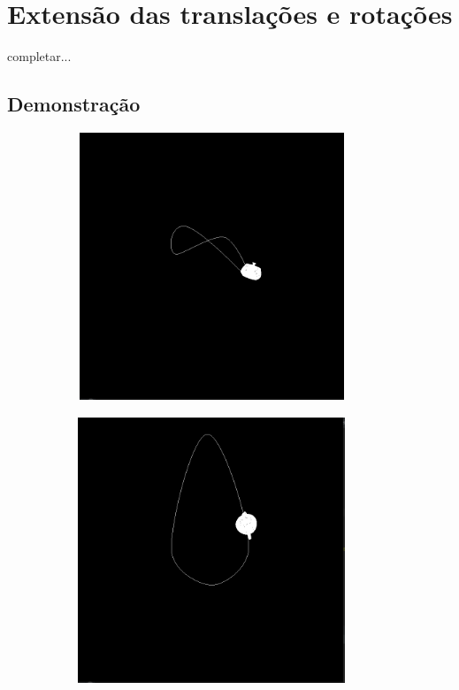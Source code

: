 \documentclass[11pt,a4paper]{report}
\begin{document}
\newpage
\section{Extensão das translações e rotações}
completar...


\subsection{Demonstração}

\vspace{1cm}
\begin{figure}[H]
\centering
\begin{subfigure}{0.5\textwidth}
  \centering
  \includegraphics[width = 8cm,height = 8cm]{catmul_teapot1.png}
  \caption{\texttt{}}
  \label{fig:catmul_teapot1}
\end{subfigure}%
\begin{subfigure}{0.5\textwidth}
  \centering
  \includegraphics[width = 8cm,height = 8cm]{catmul_teapot2.png}
  \caption{\texttt{}}
  \label{fig:catmul_teapot1}

\end{subfigure}
\end{figure}
\end{document}
